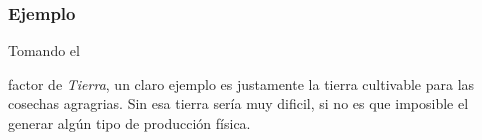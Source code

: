 \documentclass[stu, 12pt, letterpaper, donotrepeattitle, floatsintext, natbib]{apa7}
\begin{document}
\subsubsection{Ejemplo}
Tomando el \begin{justifying}
    factor de \emph{Tierra}, un claro ejemplo es justamente la tierra cultivable para las cosechas agragrias. Sin esa tierra sería muy dificil, si no es que imposible
    el generar algún tipo de producción física.\par
\end{justifying}

\newpage
\setcounter{secnumdepth}{0} %
\renewcommand\refname{\textbf{Referencias}}
\end{document}
